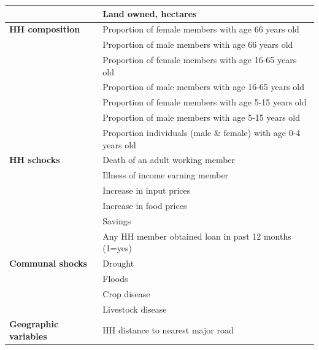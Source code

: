 \begin{table}[H]
{\begin{tabular}{ll}
                                 & Land owned, hectares                                           \\ \hline
\textbf{HH composition}         & Proportion of female members with age 66 years old             \\
                                 & Proportion of male members with age 66 years old               \\
                                 & Proportion of female members with age 16-65 years old          \\
                                 & Proportion of male members with age 16-65 years old            \\
                                 & Proportion of female members with age 5-15 years old           \\
                                 & Proportion of male members with age 5-15 years old             \\
                                 & Proportion individuals (male \& female) with age 0-4 years old \\ \hline
\textbf{HH schocks}              & Death of an adult working member                               \\
                                 & Illness of income earning member                               \\
                                 & Increase in input prices                                       \\
                                 & Increase in food prices                                        \\
                                 & Savings                                                        \\
                                 & Any HH member obtained loan in past 12 months (1=yes)          \\ \hline
\textbf{Communal shocks}        & Drought                                                        \\
                                 & Floods                                                         \\
                                 & Crop disease                                                     \\
                                 & Livestock disease                                              \\ \hline
\textbf{Geographic variables}    & HH distance to nearest major road                              \\

\end{tabular}}
\end{table}
